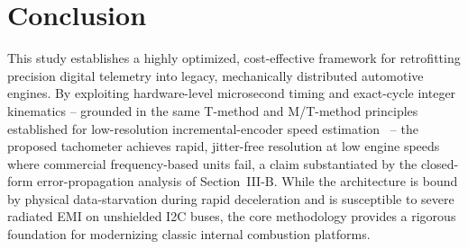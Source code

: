 \documentclass[journal, twocolumn]{IEEEtran}
\begin{document}
\section{Conclusion}
This study establishes a highly optimized, cost-effective framework for retrofitting precision digital telemetry into legacy, mechanically distributed automotive engines. By exploiting hardware-level microsecond timing and exact-cycle integer kinematics -- grounded in the same T-method and M/T-method principles established for low-resolution incremental-encoder speed estimation~\cite{petrella2007,mtmethod2017} -- the proposed tachometer achieves rapid, jitter-free resolution at low engine speeds where commercial frequency-based units fail, a claim substantiated by the closed-form error-propagation analysis of Section~III-B. While the architecture is bound by physical data-starvation during rapid deceleration and is susceptible to severe radiated EMI on unshielded I2C buses, the core methodology provides a rigorous foundation for modernizing classic internal combustion platforms.
\end{document}
